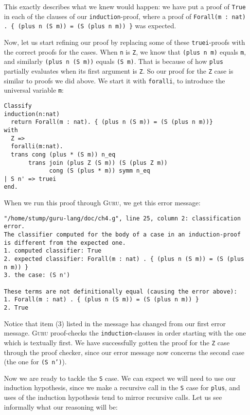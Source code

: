 \documentclass{book}[12pt]
\newcommand{\guru}[0]{\textsc{Guru}\xspace}
\begin{document}
\noindent This exactly describes what we knew would happen: we have
put a proof of \texttt{True} in each of the clauses of our
\texttt{induction}-proof, where a proof of \texttt{Forall(m : nat)
. \{ (plus n (S m)) = (S (plus n m)) \}} was expected.  

Now, let us start refining our proof by replacing some of these
\texttt{truei}-proofs with the correct proofs for the cases.
When \texttt{n} is \texttt{Z}, we know that \texttt{(plus n m)} equals
\texttt{m}, and similarly \texttt{(plus n (S m))} equals \texttt{(S m)}.
That is because of how \texttt{plus} partially evaluates when its first
argument is \texttt{Z}.  So our proof for the \texttt{Z} case is similar
to proofs we did above.  We start it with \texttt{foralli}, to introduce
the universal variable \texttt{m}:

\begin{verbatim}
Classify
induction(n:nat) 
  return Forall(m : nat). { (plus n (S m)) = (S (plus n m))}
with
  Z => 
  foralli(m:nat).
  trans cong (plus * (S m)) n_eq
       trans join (plus Z (S m)) (S (plus Z m))
             cong (S (plus * m)) symm n_eq
| S n' => truei
end.
\end{verbatim}

\noindent When we run this proof through \guru, we get this error message:

\begin{verbatim}
"/home/stump/guru-lang/doc/ch4.g", line 25, column 2: classification error.
The classifier computed for the body of a case in an induction-proof
is different from the expected one.
1. computed classifier: True
2. expected classifier: Forall(m : nat) . { (plus n (S m)) = (S (plus n m)) }
3. the case: (S n')

These terms are not definitionally equal (causing the error above):
1. Forall(m : nat) . { (plus n (S m)) = (S (plus n m)) }
2. True
\end{verbatim}

\noindent Notice that item (3) listed in the message has changed from
our first error message.  \guru proof-checks the
\texttt{induction}-clauses in order starting with the one which is
textually first.  We have successfully gotten the proof for the
\texttt{Z} case through the proof checker, since our error message now
concerns the second case (the one for \texttt{(S n')}).

Now we are ready to tackle the \texttt{S} case.  We can expect we will
need to use our induction hypothesis, since we make a recursive call
in the \texttt{S} case for \texttt{plus}, and uses of the induction
hypothesis tend to mirror recursive calls.  Let us see informally
what our reasoning will be:
\end{document}

